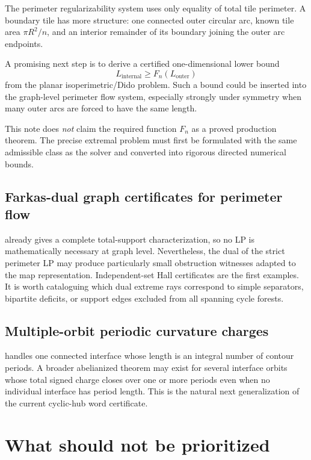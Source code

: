 \documentclass[11pt]{article}
\theoremstyle{definition}
\theoremstyle{remark}
\begin{document}
The perimeter regularizability system uses only equality of total tile perimeter.  A boundary tile has more structure: one connected outer circular arc, known tile area $\pi R^2/n$, and an interior remainder of its boundary joining the outer arc endpoints.

A promising next step is to derive a certified one-dimensional lower bound
\[
  L_{\mathrm{internal}}\ge F_n(L_{\mathrm{outer}})
\]
from the planar isoperimetric/Dido problem.  Such a bound could be inserted into the graph-level perimeter flow system, especially strongly under symmetry when many outer arcs are forced to have the same length.

This note does \emph{not} claim the required function $F_n$ as a proved production theorem.  The precise extremal problem must first be formulated with the same admissible class as the solver and converted into rigorous directed numerical bounds.

\subsection{Farkas-dual graph certificates for perimeter flow}

 already gives a complete total-support characterization, so no LP is mathematically necessary at graph level.  Nevertheless, the dual of the strict perimeter LP may produce particularly small obstruction witnesses adapted to the map representation.  Independent-set Hall certificates are the first examples.  It is worth cataloguing which dual extreme rays correspond to simple separators, bipartite deficits, or support edges excluded from all spanning cycle forests.

\subsection{Multiple-orbit periodic curvature charges}

 handles one connected interface whose length is an integral number of contour periods.  A broader abelianized theorem may exist for several interface orbits whose total signed charge closes over one or more periods even when no individual interface has period length.  This is the natural next generalization of the current cyclic-hub word certificate.

\section{What should not be prioritized}
\end{document}
